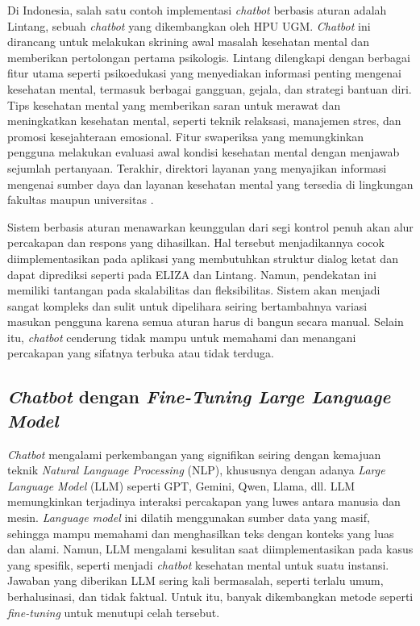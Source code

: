 Di Indonesia, salah satu contoh implementasi \textit{chatbot} berbasis aturan adalah Lintang, sebuah \textit{chatbot} yang dikembangkan oleh HPU UGM.
\textit{Chatbot} ini dirancang untuk melakukan skrining awal masalah kesehatan mental dan memberikan pertolongan pertama psikologis.
Lintang dilengkapi dengan berbagai fitur utama seperti psikoedukasi yang menyediakan informasi penting mengenai kesehatan mental, termasuk berbagai gangguan, gejala, dan strategi bantuan diri.
Tips kesehatan mental yang memberikan saran untuk merawat dan meningkatkan kesehatan mental, seperti teknik relaksasi, manajemen stres, dan promosi kesejahteraan emosional.
Fitur swaperiksa yang memungkinkan pengguna melakukan evaluasi awal kondisi kesehatan mental dengan menjawab sejumlah pertanyaan.
Terakhir, direktori layanan yang menyajikan informasi mengenai sumber daya dan layanan kesehatan mental yang tersedia di lingkungan fakultas maupun universitas \cite{Lintang}.

Sistem berbasis aturan menawarkan keunggulan dari segi kontrol penuh akan alur percakapan dan respons yang dihasilkan.
Hal tersebut menjadikannya cocok diimplementasikan pada aplikasi yang membutuhkan struktur dialog ketat dan dapat diprediksi seperti pada ELIZA dan Lintang.
Namun, pendekatan ini memiliki tantangan pada skalabilitas dan fleksibilitas.
Sistem akan menjadi sangat kompleks dan sulit untuk dipelihara seiring bertambahnya variasi masukan pengguna karena semua aturan harus di bangun secara manual.
Selain itu, \textit{chatbot} cenderung tidak mampu untuk memahami dan menangani percakapan yang sifatnya terbuka atau tidak terduga.


\subsection{\textit{Chatbot} dengan \textit{Fine-Tuning Large Language Model}}
\textit{Chatbot} mengalami perkembangan yang signifikan seiring dengan kemajuan teknik \textit{Natural Language Processing} (NLP), khususnya dengan adanya \textit{Large Language Model} (LLM) seperti GPT, Gemini, Qwen, Llama, dll.
LLM memungkinkan terjadinya interaksi percakapan yang luwes antara manusia dan mesin.
\textit{Language model} ini dilatih menggunakan sumber data yang masif, sehingga mampu memahami dan menghasilkan teks dengan konteks yang luas dan alami.
Namun, LLM mengalami kesulitan saat diimplementasikan pada kasus yang spesifik, seperti menjadi \textit{chatbot} kesehatan mental untuk suatu instansi.
Jawaban yang diberikan LLM sering kali bermasalah, seperti terlalu umum, berhalusinasi, dan tidak faktual.
Untuk itu, banyak dikembangkan metode seperti \textit{fine-tuning} untuk menutupi celah tersebut.


